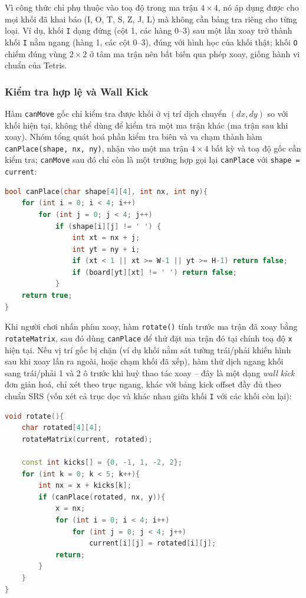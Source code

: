 Vì công thức chỉ phụ thuộc vào toạ độ trong ma trận $4\times4$, nó áp dụng được cho mọi khối đã khai báo (I, O, T, S, Z, J, L) mà không cần bảng tra riêng cho từng loại. Ví dụ, khối \texttt{I} dạng đứng (cột 1, các hàng 0--3) sau một lần xoay trở thành khối \texttt{I} nằm ngang (hàng 1, các cột 0--3), đúng với hình học của khối thật; khối \texttt{O} chiếm đúng vùng $2\times2$ ở tâm ma trận nên bất biến qua phép xoay, giống hành vi chuẩn của Tetris.

\subsubsection{Kiểm tra hợp lệ và Wall Kick}

Hàm \texttt{canMove} gốc chỉ kiểm tra được khối ở vị trí dịch chuyển $(dx, dy)$ so với khối hiện tại, không thể dùng để kiểm tra một ma trận khác (ma trận sau khi xoay). Nhóm tổng quát hoá phần kiểm tra biên và va chạm thành hàm \texttt{canPlace(shape, nx, ny)}, nhận vào một ma trận $4\times4$ bất kỳ và toạ độ gốc cần kiểm tra; \texttt{canMove} sau đó chỉ còn là một trường hợp gọi lại \texttt{canPlace} với \texttt{shape = current}:

\begin{lstlisting}[language=C++, caption={Kiểm tra một hình dạng bất kỳ có đặt được tại toạ độ (nx, ny)}]
bool canPlace(char shape[4][4], int nx, int ny){
    for (int i = 0; i < 4; i++)
        for (int j = 0; j < 4; j++)
            if (shape[i][j] != ' ') {
                int xt = nx + j;
                int yt = ny + i;
                if (xt < 1 || xt >= W-1 || yt >= H-1) return false;
                if (board[yt][xt] != ' ') return false;
            }
    return true;
}
\end{lstlisting}

Khi người chơi nhấn phím xoay, hàm \texttt{rotate()} tính trước ma trận đã xoay bằng \texttt{rotateMatrix}, sau đó dùng \texttt{canPlace} để thử đặt ma trận đó tại chính toạ độ \texttt{x} hiện tại. Nếu vị trí gốc bị chặn (ví dụ khối nằm sát tường trái/phải khiến hình sau khi xoay lấn ra ngoài, hoặc chạm khối đã xếp), hàm thử dịch ngang khối sang trái/phải 1 và 2 ô trước khi huỷ thao tác xoay -- đây là một dạng \textit{wall kick} đơn giản hoá, chỉ xét theo trục ngang, khác với bảng kick offset đầy đủ theo chuẩn SRS (vốn xét cả trục dọc và khác nhau giữa khối \texttt{I} với các khối còn lại):

\begin{lstlisting}[language=C++, caption={Xoay khối hiện tại kèm wall kick theo trục ngang}]
void rotate(){
    char rotated[4][4];
    rotateMatrix(current, rotated);

    const int kicks[] = {0, -1, 1, -2, 2};
    for (int k = 0; k < 5; k++){
        int nx = x + kicks[k];
        if (canPlace(rotated, nx, y)){
            x = nx;
            for (int i = 0; i < 4; i++)
                for (int j = 0; j < 4; j++)
                    current[i][j] = rotated[i][j];
            return;
        }
    }
}
\end{lstlisting}

